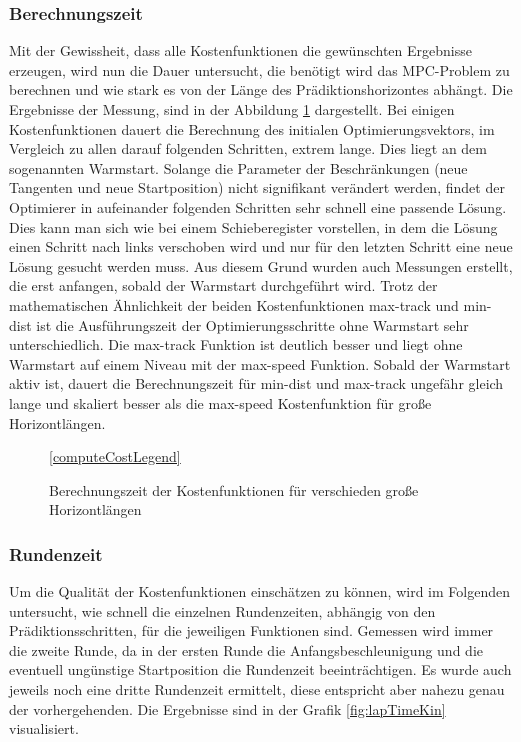 \documentclass{like}
\begin{document}
\subsubsection{Berechnungszeit}
\label{runtime}
Mit der Gewissheit, dass alle Kostenfunktionen die gewünschten Ergebnisse erzeugen, wird nun die Dauer untersucht, die benötigt wird das \ac{MPC}-Problem zu berechnen und wie stark es von der Länge des Prädiktionshorizontes abhängt. 
Die Ergebnisse der Messung, sind in der Abbildung \ref{fig:computeCost} dargestellt. Bei einigen Kostenfunktionen dauert die  Berechnung des initialen Optimierungsvektors, im Vergleich zu allen darauf folgenden Schritten, extrem lange. Dies liegt an dem sogenannten Warmstart. Solange die Parameter der Beschränkungen (neue Tangenten und neue Startposition) nicht signifikant verändert werden, findet der Optimierer in aufeinander folgenden Schritten sehr schnell eine passende Lösung. Dies kann man sich wie bei einem Schieberegister vorstellen, in dem die Lösung einen Schritt nach links verschoben wird und nur für den letzten Schritt eine neue Lösung gesucht werden muss. Aus diesem Grund wurden auch Messungen erstellt, die erst anfangen, sobald der Warmstart durchgeführt wird. 
Trotz der mathematischen Ähnlichkeit der beiden Kostenfunktionen max-track und min-dist ist die Ausführungszeit der Optimierungsschritte ohne Warmstart sehr unterschiedlich. Die max-track Funktion ist deutlich besser und liegt ohne Warmstart auf einem Niveau mit der max-speed Funktion.
Sobald der Warmstart aktiv ist, dauert die Berechnungszeit für min-dist und max-track ungefähr gleich lange und skaliert besser als die max-speed Kostenfunktion für große Horizontlängen.
\begin{figure}
	\centering

	\ref{computeCostLegend}
	\caption{Berechnungszeit der Kostenfunktionen für verschieden große Horizontlängen}\label{fig:computeCost}
\end{figure}



\subsubsection{Rundenzeit}
\label{laptime}
Um die Qualität der Kostenfunktionen einschätzen zu können, wird im Folgenden untersucht, wie schnell die einzelnen Rundenzeiten, abhängig von den Prädiktionsschritten, für die jeweiligen Funktionen sind.
Gemessen wird immer die zweite Runde, da in der ersten Runde die Anfangsbeschleunigung und die eventuell ungünstige Startposition die Rundenzeit beeinträchtigen. Es wurde auch jeweils noch eine dritte Rundenzeit ermittelt, diese entspricht aber nahezu genau der vorhergehenden. Die Ergebnisse sind in der Grafik \ref{fig:lapTimeKin} visualisiert.
\end{document}
